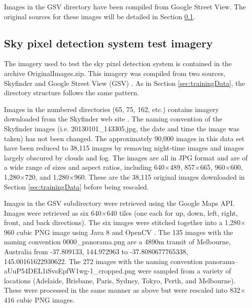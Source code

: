 \documentclass[final,3p,times,authoryear]{elsarticle}
\begin{document}
Images in the GSV directory have been compiled from Google Street View. The original sources for these images will be detailed in Section \ref{sec:origImages}.

\subsection{Sky pixel detection system test imagery}\label{sec:origImages}
The imagery used to test the \cite{Nice2019UC} sky pixel detection system is contained in the archive OriginalImages.zip. This imagery was compiled from two sources, Skyfinder \citep{Mihail2016} and Google Street View (GSV) \citep{GoogleMaps2017b}. As in Section \ref{sec:trainingData}, the directory structure follows the same pattern. 

Images in the numbered directories (65, 75, 162, etc.) contains imagery downloaded from the Skyfinder web site \citep{Mihail2015}. The naming convention of the Skyfinder images (i.e. 20130101\_143305.jpg, the date and time the image was taken) has not been changed. The approximately 90,000 images in this data set have been reduced to 38,115 images by removing night-time images and images largely obscured by clouds and fog. The images are all in JPG format and are of a wide range of sizes and aspect ratios, including 640$\times$489, 857$\times$665, 960$\times$600, 1,280$\times$720, and 1,280$\times$960. These are the 38,115 original images downloaded in Section \ref{sec:trainingData} before being rescaled.

Images in the GSV subdirectory were retrieved using the Google Maps API. Images were retrieved as six 640$\times$640 tiles (one each for up, down, left, right, front, and back directions). The six images were stitched together into a 1,280$\times$960 cubic PNG image using Java 8 \citep{Oracle2018} and OpenCV \citep {Bradski2000}. The 135 images with the naming convention 0000\_panorama.png are a 4890m transit of Melbourne, Australia from -37.809133, 144.972963 to -37.8080677765338, 145.00161622930622. The 272 images with the naming convention  panorama--aUuP54DEL1iSvsEpfW1wg-1\_cropped.png were sampled from a variety of locations (Adelaide, Brisbane, Paris, Sydney, Tokyo, Perth, and Melbourne). These were processed in the same manner as above but were rescaled into 832$\times$416 cubic PNG images.


\end{document}
